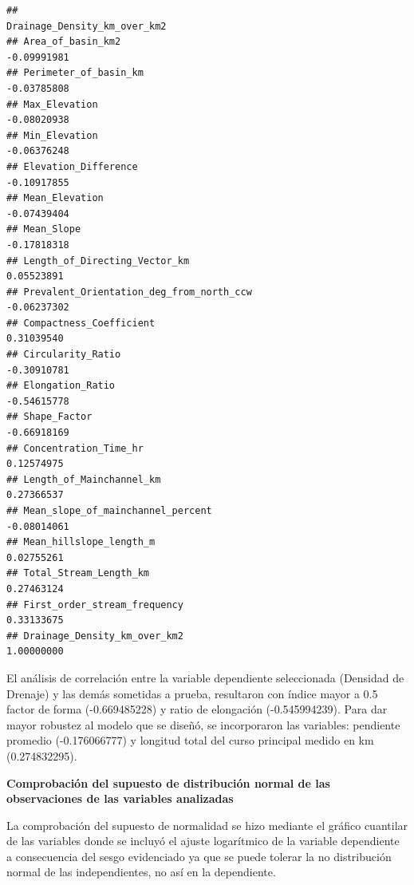 \documentclass[11pt,]{article}
\begin{document}
\begin{verbatim}
##                                          Drainage_Density_km_over_km2
## Area_of_basin_km2                                         -0.09991981
## Perimeter_of_basin_km                                     -0.03785808
## Max_Elevation                                             -0.08020938
## Min_Elevation                                             -0.06376248
## Elevation_Difference                                      -0.10917855
## Mean_Elevation                                            -0.07439404
## Mean_Slope                                                -0.17818318
## Length_of_Directing_Vector_km                              0.05523891
## Prevalent_Orientation_deg_from_north_ccw                  -0.06237302
## Compactness_Coefficient                                    0.31039540
## Circularity_Ratio                                         -0.30910781
## Elongation_Ratio                                          -0.54615778
## Shape_Factor                                              -0.66918169
## Concentration_Time_hr                                      0.12574975
## Length_of_Mainchannel_km                                   0.27366537
## Mean_slope_of_mainchannel_percent                         -0.08014061
## Mean_hillslope_length_m                                    0.02755261
## Total_Stream_Length_km                                     0.27463124
## First_order_stream_frequency                               0.33133675
## Drainage_Density_km_over_km2                               1.00000000
\end{verbatim}

El análisis de correlación entre la variable dependiente seleccionada
(Densidad de Drenaje) y las demás sometidas a prueba, resultaron con
índice mayor a 0.5 factor de forma (-0.669485228) y ratio de elongación
(-0.545994239). Para dar mayor robustez al modelo que se diseñó, se
incorporaron las variables: pendiente promedio (-0.176066777) y longitud
total del curso principal medido en km (0.274832295).

\textbf{Comprobación del supuesto de distribución normal de las
observaciones de las variables analizadas}

La comprobación del supuesto de normalidad se hizo mediante el gráfico
cuantilar de las variables donde se incluyó el ajuste logarítmico de la
variable dependiente a consecuencia del sesgo evidenciado ya que se
puede tolerar la no distribución normal de las independientes, no así en
la dependiente.
\end{document}
